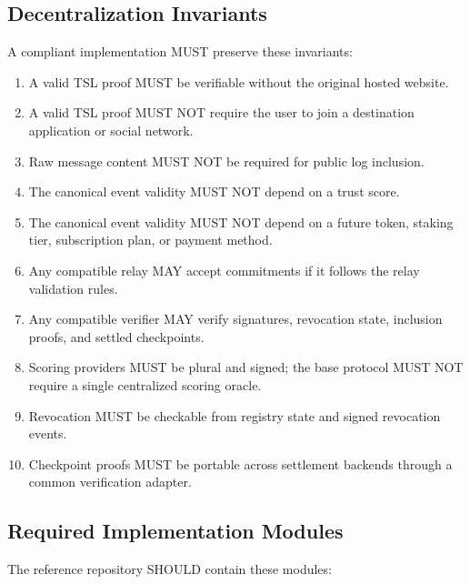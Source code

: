 \documentclass[11pt]{article}
\newcommand{\TSL}{\textsc{TSL}}
\begin{document}
\subsection{Decentralization Invariants}

A compliant implementation MUST preserve these invariants:

\begin{enumerate}
    \item A valid \TSL{} proof MUST be verifiable without the original hosted website.
    \item A valid \TSL{} proof MUST NOT require the user to join a destination application or social network.
    \item Raw message content MUST NOT be required for public log inclusion.
    \item The canonical event validity MUST NOT depend on a trust score.
    \item The canonical event validity MUST NOT depend on a future token, staking tier, subscription plan, or payment method.
    \item Any compatible relay MAY accept commitments if it follows the relay validation rules.
    \item Any compatible verifier MAY verify signatures, revocation state, inclusion proofs, and settled checkpoints.
    \item Scoring providers MUST be plural and signed; the base protocol MUST NOT require a single centralized scoring oracle.
    \item Revocation MUST be checkable from registry state and signed revocation events.
    \item Checkpoint proofs MUST be portable across settlement backends through a common verification adapter.
\end{enumerate}

\subsection{Required Implementation Modules}

The reference repository SHOULD contain these modules:
\end{document}
